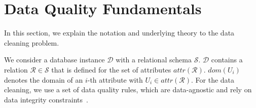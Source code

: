 \section{Data Quality Fundamentals}
\label{sec:expl}
In this section, we explain the notation and underlying theory to the data cleaning problem. 

We consider a database instance $\mathcal{D}$ with a relational schema $\mathcal{S}$. $\mathcal{D}$ contains a relation $\mathcal{R} \in \mathcal{S}$ that is defined for the set of attributes $attr(\mathcal{R})$. $dom(U_i)$ denotes the domain of an $i$-th attribute with $U_i \in attr(\mathcal{R})$. For the data cleaning, we use a set of data quality rules, which are data-agnostic and rely on data integrity constraints~\cite{AbiteboulHV95, fan2012foundations}.

